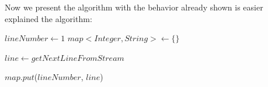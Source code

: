Now we present the algorithm with the behavior already shown is easier explained
the algorithm:

\begin{algorithm}
\begin{algorithmic}[1]
	\Statex

		\State $lineNumber \leftarrow 1$
		\State $map<Integer, String> \leftarrow  \{\}$\\

		 {

			\State $line \leftarrow getNextLineFromStream$

			\State $map.put$($lineNumber$, $line$)

		}

	\EndFunction
\end{algorithmic}
\end{algorithm}
